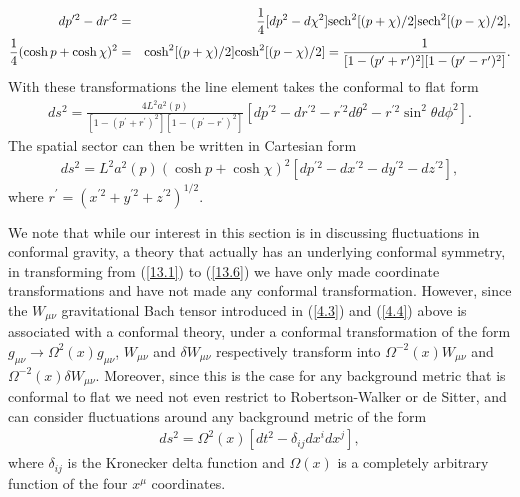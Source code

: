 \documentclass[aps,onecolumn,10pt]{revtex4}
\numberwithin{equation}{section}
\numberwithin{equation}{section}
\begin{document}
%
\begin{eqnarray}
dp^{\prime 2}-dr^{\prime 2}&=&\frac{1}{4}[dp^2-d\chi^2]{\rm sech}^2[(p+\chi)/2]{\rm sech}^2[(p-\chi)/2],
\nonumber\\
\frac{1}{4}(\cosh p+\cosh \chi)^2&=&{\rm \cosh}^2[(p+\chi)/2]{\rm \cosh}^2[(p-\chi)/2]=\frac{1}{[1-(p^{\prime}+r^{\prime})^2][1-(p^{\prime}-r^{\prime})^2]}.
\label{13.4}
\end{eqnarray}
%
With these transformations the line element takes the conformal to flat form
%
\begin{eqnarray}
ds^2=\frac{4L^2a^2(p)}{[1-(p^{\prime}+r^{\prime})^2][1-(p^{\prime}-r^{\prime})^2]}\left[dp^{\prime 2}-dr^{\prime 2} -r^{\prime 2}d\theta^2-r^{\prime 2} \sin^2\theta d\phi^2\right].
\label{13.5}
\end{eqnarray}
%
The spatial sector can then be written in Cartesian form
%
\begin{eqnarray}
ds^2=L^2a^2(p)(\cosh p+\cosh \chi)^2\left[dp^{\prime 2}-dx^{\prime 2} -dy^{\prime 2} -dz^{\prime 2}\right],
\label{13.6}
\end{eqnarray}
%
where $r^{\prime}=(x^{\prime 2}+ y^{\prime 2}+z^{\prime 2})^{1/2}$.  

We note that while our interest in this section is in discussing fluctuations in conformal gravity, a theory that actually has an underlying conformal symmetry, in transforming from (\ref{13.1})  to (\ref{13.6}) we have only made coordinate transformations and have not made any conformal transformation. However, since the $W_{\mu\nu}$ gravitational Bach tensor introduced in (\ref{4.3}) and (\ref{4.4}) above is associated with a conformal theory, under a conformal transformation of the form $g_{\mu\nu}\rightarrow \Omega^{2}(x)g_{\mu\nu}$, $W_{\mu\nu}$ and $\delta W_{\mu\nu}$ respectively transform into $\Omega^{-2}(x)W_{\mu\nu}$ and $\Omega^{-2}(x)\delta W_{\mu\nu}$. Moreover, since this is the case for any background metric that is conformal to flat we need not even restrict to Robertson-Walker or de Sitter, and can consider fluctuations around any background metric of the form 
%
\begin{eqnarray}
ds^2=\Omega^2(x)[dt^2-\delta_{ij}dx^idx^j],
\label{13.7}
\end{eqnarray}
%
where $\delta_{ij}$ is the Kronecker delta function and $\Omega(x)$ is a completely arbitrary function of the four $x^{\mu}$ coordinates.
\end{document}
